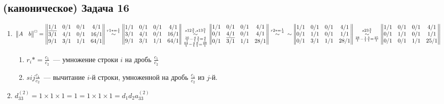 \documentclass[a4paper]{article}
\begin{document}
\subsection*{(каноническое) Задача 16}
\begin{enumerate}
\item $\begin{Vmatrix}
A & b
\end{Vmatrix}^\Box=\begin{Vmatrix}
\underline{1/1} & 0/1 & 0/1 & 4/1\\
3/1 & 4/1 & 0/1 & 16/1\\
9/1 & 3/1 & 1/1 & 64/1\\
\end{Vmatrix}
\overset{r1 *= \frac{1}{1}}{\sim}
\begin{Vmatrix}
1/1 & 0/1 & 0/1 & 4/1\\
3/1 & 4/1 & 0/1 & 16/1\\
9/1 & 3/1 & 1/1 & 64/1\\
\end{Vmatrix}
\underset{\substack{\frac{16}{1}-\frac{4}{1}\frac{3}{1}=\frac{4}{1}\\\frac{64}{1}-\frac{4}{1}\frac{9}{1}=\frac{28}{1}}}{\overset{s 1 2 \frac{3}{1}, s 1 3 \frac{9}{1}}{\sim}}
\begin{Vmatrix}
1/1 & 0/1 & 0/1 & 4/1\\
0/1 & \underline{4/1} & 0/1 & 4/1\\
0/1 & 3/1 & 1/1 & 28/1\\
\end{Vmatrix}
\overset{r2 *= \frac{1}{4}}{\sim}\newline\sim
\begin{Vmatrix}
1/1 & 0/1 & 0/1 & 4/1\\
0/1 & 1/1 & 0/1 & 1/1\\
0/1 & 3/1 & 1/1 & 28/1\\
\end{Vmatrix}
\underset{\frac{28}{1}-\frac{1}{1}\frac{3}{1}=\frac{25}{1}}{\overset{s 2 3 \frac{3}{1}}{\sim}}
\begin{Vmatrix}
1/1 & 0/1 & 0/1 & 4/1\\
0/1 & 1/1 & 0/1 & 1/1\\
0/1 & 0/1 & 1/1 & 25/1\\
\end{Vmatrix}
$
\begin{enumerate}
\item $r_i *= \frac{c_1}{c_2}$~--- умножение строки $i$ на дробь $\frac{c_1}{c_2}$
\item $s i j \frac{c_1}{c_2}$~--- вычитание $i$-й строки, умноженной на дробь $\frac{c_1}{c_2}$ из $j$-й.
\end{enumerate}
\item $d_{33}^{(2)}=1\times 1\times 1=1=1\times 1\times 1=d_1d_2a_{33}^{(2)}$
\end{enumerate}
\end{document}

